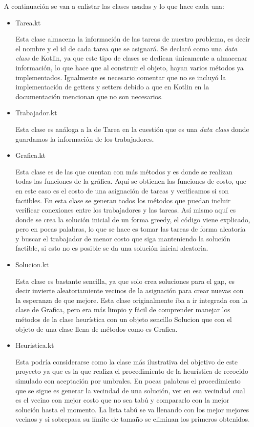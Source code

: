 \documentclass{article}
\begin{document}
A continuación se van a enlistar las clases usadas y lo que hace cada una:
\begin{itemize}
	\item {Tarea.kt
		
		Esta clase almacena la información de las tareas de nuestro problema, es decir el nombre y el id de cada tarea que se asignará. Se declaró como una \emph{data class} de Kotlin, ya que este tipo de clases se dedican únicamente a almacenar información, lo que hace que al construir el objeto, hayan varios métodos ya implementados. Igualmente es necesario comentar que no se incluyó la implementación de getters y setters debido a que en Kotlin en la documentación mencionan que no son necesarios.
	}
	\item {Trabajador.kt
		
		Esta clase es análoga a la de Tarea en la cuestión que es una \emph{data class} donde guardamos la información de los trabajadores.
	}
	\item {Grafica.kt
		
		Esta clase es de las que cuentan con más métodos y es donde se realizan todas las funciones de la gráfica. Aquí se obtienen las funciones de costo, que en este caso es el costo de una asignación de tareas y verificamos si son factibles. En esta clase se generan todos los métodos que puedan incluir verificar conexiones entre los trabajadores y las tareas. Así mismo aquí es donde se crea la solución inicial de un forma greedy, el código viene explicado, pero en pocas palabras, lo que se hace es tomar las tareas de forma aleatoria y buscar el trabajador de menor costo que siga manteniendo la solución factible, si esto no es posible se da una solución inicial aleatoria.
	}
	\item {Solucion.kt
		
		Esta clase es bastante sencilla, ya que solo crea soluciones para el gap, es decir invierte aleatoriamiente vecinos de la asignación para crear nuevas con la esperanza de que mejore. Esta clase originalmente iba a ir integrada con la clase de Grafica, pero era más limpio y fácil de comprender manejar los métodos de la clase heurística con un objeto sencillo Solucion que con el objeto de una clase llena de métodos como es Grafica.
		
	}
	\item {Heuristica.kt
		
		Esta podría considerarse como la clase más ilustrativa del objetivo de este proyecto ya que es la que realiza el procedimiento de la heurística de recocido simulado con aceptación por umbrales. En pocas palabras el procedimiento que se sigue es generar la vecindad de una solución, ver en esa vecindad cual es el vecino con mejor costo que no sea tabú y compararlo con la mejor solución hasta el momento. La lista tabú se va llenando con los mejor mejores vecinos y si sobrepasa su límite de tamaño se eliminan los primeros obtenidos.
		
}
\end{itemize}
\end{document}
